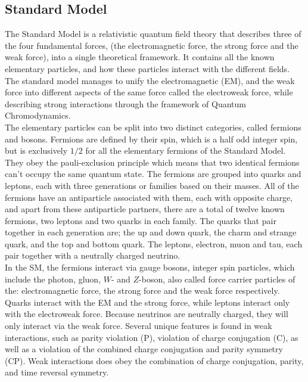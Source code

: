 \documentclass[12pt,a4paper]{article}
\numberwithin{equation}{section}
\begin{document}
\subsection{Standard Model}
The Standard Model is a relativistic quantum field theory that describes three
of the four fundamental forces, (the electromagnetic force, the strong force and
the weak force), into a single theoretical framework. It contains all the known
elementary particles, and how these particles interact with the different
fields. The standard model manages to unify the electromagnetic (EM), and the
weak force into different aspects of the same force called the electroweak
force, while describing strong interactions through the framework of Quantum
Chromodynamics.\\

The elementary particles can be split into two distinct categories, called
fermions and bosons. Fermions are defined by their spin, which is a half odd
integer spin, but is exclusively $1/2$ for all the elementary fermions of the
Standard Model. They obey the pauli-exclusion principle which means that two
identical fermions can't occupy the same quantum state. The fermions are grouped
into quarks and leptons, each with three generations or families based on their
masses. All of the fermions have an antiparticle associated with them, each with
opposite charge, and apart from these antiparticle partners, there are a total
of twelve known fermions, two leptons and two quarks in each family. The quarks
that pair together in each generation are; the up and down quark, the charm and
strange quark, and the top and bottom quark. The leptons, electron, muon and
tau, each pair together with a neutrally charged neutrino.\\


In the SM, the fermions interact via gauge bosons, integer spin particles, which
include the photon, gluon, $W$- and $Z$-boson, also called force carrier
particles of the: electromagnetic force, the strong force and the weak force
respectively. Quarks interact with the EM and the strong force, while leptons
interact only with the electroweak force. Because neutrinos are neutrally
charged, they will only interact via the weak force. Several unique features is
found in weak interactions, such as parity violation (P), violation of charge
conjugation (C), as well as a violation of the combined charge conjugation and
parity symmetry (CP). Weak interactions does obey the combination of charge
conjugation, parity, and time reversal symmetry.
\end{document}
